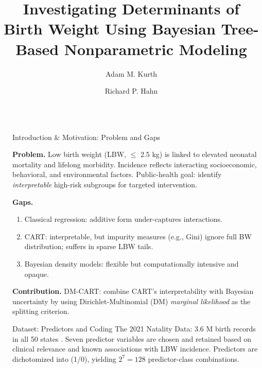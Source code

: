 \documentclass[final]{beamer}
\title{Investigating Determinants of Birth Weight Using Bayesian Tree-Based Nonparametric Modeling}
\author{Adam M. Kurth \inst{1} \and Richard P. Hahn \inst{2}}
\institute[shortinst]{\inst{1} Brown University, School of Public Health \samelineand \inst{2} Arizona State University}
\newlength{\sepwidth}
\newlength{\colwidth}
\newcommand{\tightlist}{\setlength\itemsep{0.2em}\setlength\topsep{0em}\setlength\parsep{0em}}
\newcommand{\separatorcolumn}{\begin{column}{\sepwidth}\end{column}}
\begin{document}
\begin{frame}[t]
\begin{columns}[t]
\separatorcolumn

\begin{column}{\colwidth}
\vspace{-1em}
\begin{block}{Introduction \& Motivation: Problem and Gaps}

    \textbf{Problem.} Low birth weight (LBW, \(\le\) 2.5 kg) is linked to elevated neonatal mortality and lifelong morbidity. Incidence reflects interacting socioeconomic, behavioral, and environmental factors. Public-health goal: identify \emph{interpretable} high-risk subgroups for targeted intervention. 

    \textbf{Gaps.}\vspace{-0.8em}
    \small
    \begin{enumerate}\tightlist
      \item Classical regression: additive form under-captures interactions.
      \item CART: interpretable, but impurity measures (e.g., Gini) ignore full BW distribution; suffers in sparse LBW tails.
      \item Bayesian density models: flexible but computationally intensive and opaque.
    \end{enumerate}

    \normalsize
    \textbf{Contribution.} DM-CART: combine CART's interpretability with Bayesian uncertainty by using Dirichlet-Multinomial (DM) \emph{marginal likelihood} as the splitting criterion. 
    
\end{block}


\begin{alertblock}{Dataset: Predictors and Coding}
    The 2021 Natality Data: 3.6 M birth records in all 50 states \cite{nber_birth_data}. 
    Seven predictor variables are chosen and retained based on clinical relevance and known associations with LBW incidence. Predictors are dichotomized into (1/0), yielding \(2^7 = 128\) predictor-class combinations.
    

\end{alertblock}
\end{column}
\end{columns}
\end{frame}
\end{document}

